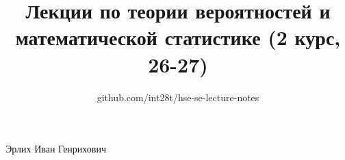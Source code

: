 \documentclass[a4paper,12pt]{article}
\title{Лекции по теории вероятностей и математической статистике (2 курс, 26-27)}
\author{github.com/int28t/hse-se-lecture-notes}
\date{}
\begin{document}
    \pagestyle{empty}
	\maketitle
    \thispagestyle{empty}
    \begin{flushright}
		Эрлих Иван Генрихович
	\end{flushright}
    \hypertarget{contents}{}
	\tableofcontents{}
    \newpage
    \pagestyle{plain}
    
    
    
    
    
    
    
    
    
    
    
    
\end{document}
